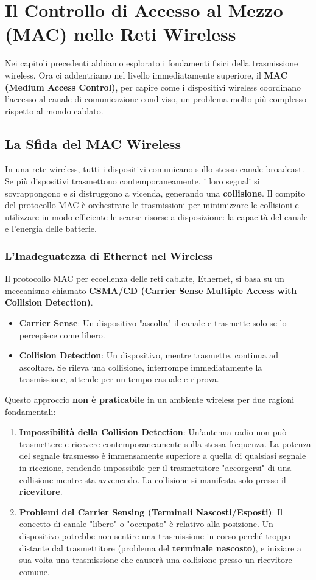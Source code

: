 \chapter{Il Controllo di Accesso al Mezzo (MAC) nelle Reti Wireless}
Nei capitoli precedenti abbiamo esplorato i fondamenti fisici della trasmissione wireless. Ora ci addentriamo nel livello immediatamente superiore, il \textbf{MAC (Medium Access Control)}, per capire come i dispositivi wireless coordinano l'accesso al canale di comunicazione condiviso, un problema molto più complesso rispetto al mondo cablato.

\section{La Sfida del MAC Wireless}
In una rete wireless, tutti i dispositivi comunicano sullo stesso canale broadcast. Se più dispositivi trasmettono contemporaneamente, i loro segnali si sovrappongono e si distruggono a vicenda, generando una \textbf{collisione}. Il compito del protocollo MAC è orchestrare le trasmissioni per minimizzare le collisioni e utilizzare in modo efficiente le scarse risorse a disposizione: la capacità del canale e l'energia delle batterie.

\subsection{L'Inadeguatezza di Ethernet nel Wireless}
Il protocollo MAC per eccellenza delle reti cablate, Ethernet, si basa su un meccanismo chiamato \textbf{CSMA/CD (Carrier Sense Multiple Access with Collision Detection)}.
\begin{itemize}
    \item \textbf{Carrier Sense}: Un dispositivo "ascolta" il canale e trasmette solo se lo percepisce come libero.
    \item \textbf{Collision Detection}: Un dispositivo, mentre trasmette, continua ad ascoltare. Se rileva una collisione, interrompe immediatamente la trasmissione, attende per un tempo casuale e riprova.
\end{itemize}

Questo approccio \textbf{non è praticabile} in un ambiente wireless per due ragioni fondamentali:
\begin{enumerate}
    \item \textbf{Impossibilità della Collision Detection}: Un'antenna radio non può trasmettere e ricevere contemporaneamente sulla stessa frequenza. La potenza del segnale trasmesso è immensamente superiore a quella di qualsiasi segnale in ricezione, rendendo impossibile per il trasmettitore "accorgersi" di una collisione mentre sta avvenendo. La collisione si manifesta solo presso il \textbf{ricevitore}.
    \item \textbf{Problemi del Carrier Sensing (Terminali Nascosti/Esposti)}: Il concetto di canale "libero" o "occupato" è relativo alla posizione. Un dispositivo potrebbe non sentire una trasmissione in corso perché troppo distante dal trasmettitore (problema del \textbf{terminale nascosto}), e iniziare a sua volta una trasmissione che causerà una collisione presso un ricevitore comune.
\end{enumerate}

